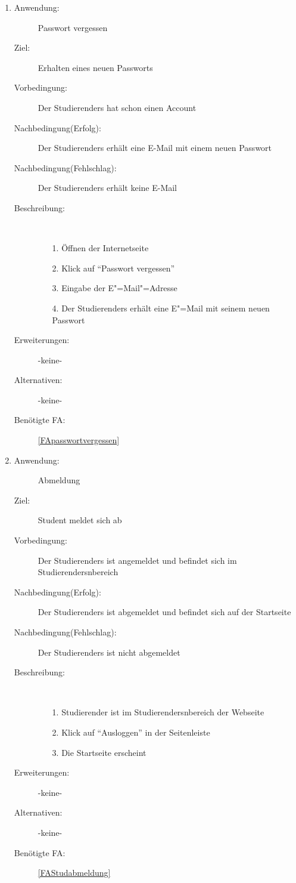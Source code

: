 \documentclass[parskip=full]{scrartcl}
\newcommand{\swtLabel}[1]{\textbf{/#1\arabic*0/}}
\begin{document}
\begin{enumerate}[label=\swtLabel{S}]
 
  \item \label{UCstudNewPasswort}
    \begin{description}
  	\item[Anwendung:] Passwort vergessen
  	\item[Ziel:] Erhalten eines neuen Passworts
  	\item[Vorbedingung:] Der \glspl{Studierender} hat schon einen Account
  	\item[Nachbedingung(Erfolg):] Der \glspl{Studierender} erhält eine E-Mail mit einem
  	neuen Passwort
  	\item[Nachbedingung(Fehlschlag):] Der \glspl{Studierender} erhält keine E-Mail
  	\item[Beschreibung:]~
  	\begin{enumerate}
  	  \item[1.] Öffnen der Internetseite
      \item[2.] Klick auf \enquote{Passwort vergessen}
      \item[3.] Eingabe der E"=Mail"=Adresse
      \item[4.] Der \glspl{Studierender} erhält eine E"=Mail mit seinem neuen Passwort
  	\end{enumerate}
  	\item[Erweiterungen:] -keine-
  	\item[Alternativen:] -keine-
  	\item[Benötigte FA:] \ref{FApasswortvergessen}
  \end{description}
  
  \item \label{UCstudLogout}
    \begin{description}
  	\item[Anwendung:] Abmeldung
  	\item[Ziel:] Student meldet sich ab
  	\item[Vorbedingung:] Der \glspl{Studierender} ist angemeldet und befindet sich im \glspl{Studierender}nbereich
  	\item[Nachbedingung(Erfolg):] Der \glspl{Studierender} ist abgemeldet und befindet sich auf der Startseite
  	\item[Nachbedingung(Fehlschlag):] Der \glspl{Studierender} ist nicht abgemeldet
  	\item[Beschreibung:]~
  	\begin{enumerate}
  	  \item[1.] \gls{Studierender} ist im \glspl{Studierender}nbereich der Webseite
      \item[2.] Klick auf \enquote{Ausloggen} in der Seitenleiste
      \item[3.] Die Startseite erscheint
  	\end{enumerate}
  	\item[Erweiterungen:] -keine-
  	\item[Alternativen:] -keine-
  	\item[Benötigte FA:] \ref{FAStudabmeldung}
  \end{description}
   
\end{enumerate}
\end{document}
